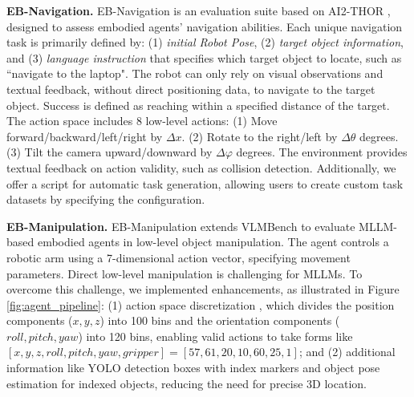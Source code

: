 
\textbf{EB-Navigation.}
EB-Navigation is an evaluation suite based on AI2-THOR \cite{kolve2017ai2}, designed to assess embodied agents' navigation abilities. 
Each unique navigation task is primarily defined by: (1) \textit{initial Robot Pose}, (2) \textit{target object information}, and (3) \textit{language instruction} that specifies which target object to locate, such as ``navigate to the laptop". The robot can only rely on visual observations and textual feedback, without direct positioning data, to navigate to the target object.
Success is defined as reaching within a specified distance of the target. The action space includes 8 low-level actions:
(1) Move forward/backward/left/right by $\Delta x$.   
(2) Rotate to the right/left by $\Delta \theta$ degrees.  
(3) Tilt the camera upward/downward by $\Delta \varphi$ degrees.
The environment provides textual feedback on action validity, such as collision detection. Additionally, we offer a script for automatic task generation, allowing users to create custom task datasets by specifying the configuration.





\textbf{EB-Manipulation.}
EB-Manipulation extends VLMBench \cite{zheng2022vlmbench} to evaluate MLLM-based embodied agents in low-level object manipulation. 
The agent controls a robotic arm using a 7-dimensional action vector, specifying movement parameters. Direct low-level manipulation is challenging for MLLMs. To overcome this challenge, we implemented enhancements, as illustrated in Figure \ref{fig:agent_pipeline}: (1) action space discretization \cite{yin2024context}, which divides the position components ($x,y,z$) into 100 bins and the orientation components ($roll, pitch, yaw$) into 120 bins, enabling valid actions to take forms like $[x, y, z, roll, pitch, yaw, gripper]=[57,61,20,10,60,25,1]$; and (2) additional information like YOLO \cite{redmon2016you} detection boxes with index markers \cite{yang2023set} and object pose estimation for indexed objects, reducing the need for precise 3D location. 



